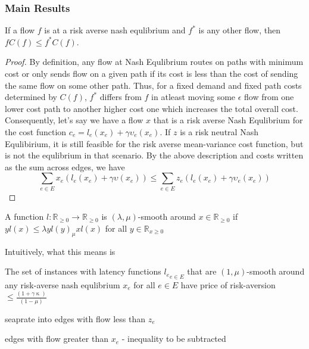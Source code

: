 \subsubsection{Main Results}
\begin{theorem}
    If a flow $f$ is at a risk averse nash equlibrium and $f^*$ is any other flow, then $fC(f)\leq f^*C(f)$. 
\end{theorem}

\begin{proof}
    By definition, any flow at Nash Equlibrium routes on paths with minimum cost or only sends flow on a given path if its cost is less than
    the cost of sending the same flow on some other path. Thus, for a fixed demand and fixed path costs determined by $C(f)$, $f^*$ differs from $f$ in 
    atleast moving some $\epsilon$ flow from one lower cost path to another higher cost one which increases the total overall cost. 
    Consequently, let's say we have a flow $x$ that is a risk averse Nash Equlibrium 
    for the cost function $c_e = l_e(x_e) +\gamma \upsilon_e(x_e)$. If $z$ is a risk neutral Nash Equlibirium, it is still feasible for the risk averse
    mean-variance cost function, but is not the equlibrium in that scenario. By the above description and costs written as the sum across edges, we have
    $$\sum_{e \in E}x_e(l_e(x_e) + \gamma \upsilon(x_e)) \leq \sum_{e \in E} z_e(l_e(x_e) + \gamma \upsilon_e(x_e))$$
\end{proof}

\begin{definition}
    A function $l :\mathbb{R}_{\geq 0} \rightarrow \mathbb{R}_{\geq 0}$ is $(\lambda, \mu)$-smooth around $x \in \mathbb{R}_{\geq 0}$ if $yl(x) \leq \lambda yl(y) _ \mu x l(x)$ for all
    $y \in \mathbb{R}_{x \geq 0}$

    Intuitively, what this means is  
\end{definition}

\begin{theorem}
    The set of instances with latency functions ${l_e}_{e \in E}$ that are $(1,\mu)$-smooth around any risk-averse nash equlibrium $x_e$ for all $e \in E$ have price of risk-aversion
    $\leq \displaystyle \frac{(1 + \gamma \upkappa)}{(1 - \mu)}$
\end{theorem}

\begin{proof-sketch}
    seaprate into edges with flow less than $z_e$

    edges with flow greater than $x_e$
    - inequality to be subtracted
\end{proof-sketch}


